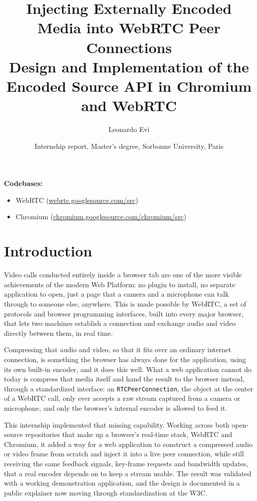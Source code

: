 \documentclass[11pt]{article}
\title{
    Injecting Externally Encoded Media into WebRTC Peer Connections \\
    \large Design and Implementation of the Encoded Source API in Chromium and WebRTC
}
\author{Leonardo Evi}
\date{Internship report, Master's degree, Sorbonne University, Paris}
\begin{document}
\maketitle

\noindent\textbf{Codebases:}
\begin{itemize}[nosep]
    \item WebRTC (\url{webrtc.googlesource.com/src})
    \item Chromium (\url{chromium.googlesource.com/chromium/src})
\end{itemize}

\tableofcontents

\section{Introduction}
\label{sec:introduction}

Video calls conducted entirely inside a browser tab are one of the more visible achievements of the modern Web Platform: no plugin to install, no separate application to open, just a page that a camera and a microphone can talk through to someone else, anywhere. This is made possible by WebRTC, a set of protocols and browser programming interfaces, built into every major browser, that lets two machines establish a connection and exchange audio and video directly between them, in real time.

Compressing that audio and video, so that it fits over an ordinary internet connection, is something the browser has always done for the application, using its own built-in encoder, and it does this well. What a web application cannot do today is compress that media itself and hand the result to the browser instead, through a standardized interface: an \texttt{RTCPeerConnection}, the object at the center of a WebRTC call, only ever accepts a raw stream captured from a camera or microphone, and only the browser's internal encoder is allowed to feed it.

This internship implemented that missing capability. Working across both open-source repositories that make up a browser's real-time stack, WebRTC and Chromium, it added a way for a web application to construct a compressed audio or video frame from scratch and inject it into a live peer connection, while still receiving the same feedback signals, key-frame requests and bandwidth updates, that a real encoder depends on to keep a stream usable. The result was validated with a working demonstration application, and the design is documented in a public explainer now moving through standardization at the W3C.
\end{document}
